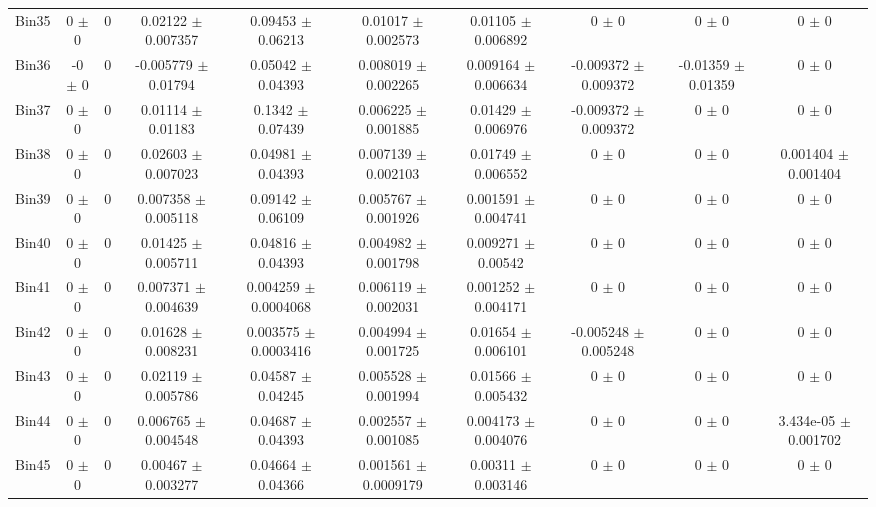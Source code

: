 \begin{tabular}{@{\extracolsep{4pt}}lccccccccc@{}}
     Bin35 & 0 $\pm$ 0 & 0 & 0.02122 $\pm$ 0.007357 & 0.09453 $\pm$ 0.06213 & 0.01017 $\pm$ 0.002573 & 0.01105 $\pm$ 0.006892 & 0 $\pm$ 0 & 0 $\pm$ 0 & 0 $\pm$ 0 \\ 
     Bin36 & -0 $\pm$ 0 & 0 & -0.005779 $\pm$ 0.01794 & 0.05042 $\pm$ 0.04393 & 0.008019 $\pm$ 0.002265 & 0.009164 $\pm$ 0.006634 & -0.009372 $\pm$ 0.009372 & -0.01359 $\pm$ 0.01359 & 0 $\pm$ 0 \\ 
     Bin37 & 0 $\pm$ 0 & 0 & 0.01114 $\pm$ 0.01183 & 0.1342 $\pm$ 0.07439 & 0.006225 $\pm$ 0.001885 & 0.01429 $\pm$ 0.006976 & -0.009372 $\pm$ 0.009372 & 0 $\pm$ 0 & 0 $\pm$ 0 \\ 
     Bin38 & 0 $\pm$ 0 & 0 & 0.02603 $\pm$ 0.007023 & 0.04981 $\pm$ 0.04393 & 0.007139 $\pm$ 0.002103 & 0.01749 $\pm$ 0.006552 & 0 $\pm$ 0 & 0 $\pm$ 0 & 0.001404 $\pm$ 0.001404 \\ 
     Bin39 & 0 $\pm$ 0 & 0 & 0.007358 $\pm$ 0.005118 & 0.09142 $\pm$ 0.06109 & 0.005767 $\pm$ 0.001926 & 0.001591 $\pm$ 0.004741 & 0 $\pm$ 0 & 0 $\pm$ 0 & 0 $\pm$ 0 \\ 
     Bin40 & 0 $\pm$ 0 & 0 & 0.01425 $\pm$ 0.005711 & 0.04816 $\pm$ 0.04393 & 0.004982 $\pm$ 0.001798 & 0.009271 $\pm$ 0.00542 & 0 $\pm$ 0 & 0 $\pm$ 0 & 0 $\pm$ 0 \\ 
     Bin41 & 0 $\pm$ 0 & 0 & 0.007371 $\pm$ 0.004639 & 0.004259 $\pm$ 0.0004068 & 0.006119 $\pm$ 0.002031 & 0.001252 $\pm$ 0.004171 & 0 $\pm$ 0 & 0 $\pm$ 0 & 0 $\pm$ 0 \\ 
     Bin42 & 0 $\pm$ 0 & 0 & 0.01628 $\pm$ 0.008231 & 0.003575 $\pm$ 0.0003416 & 0.004994 $\pm$ 0.001725 & 0.01654 $\pm$ 0.006101 & -0.005248 $\pm$ 0.005248 & 0 $\pm$ 0 & 0 $\pm$ 0 \\ 
     Bin43 & 0 $\pm$ 0 & 0 & 0.02119 $\pm$ 0.005786 & 0.04587 $\pm$ 0.04245 & 0.005528 $\pm$ 0.001994 & 0.01566 $\pm$ 0.005432 & 0 $\pm$ 0 & 0 $\pm$ 0 & 0 $\pm$ 0 \\ 
     Bin44 & 0 $\pm$ 0 & 0 & 0.006765 $\pm$ 0.004548 & 0.04687 $\pm$ 0.04393 & 0.002557 $\pm$ 0.001085 & 0.004173 $\pm$ 0.004076 & 0 $\pm$ 0 & 0 $\pm$ 0 & 3.434e-05 $\pm$ 0.001702 \\ 
     Bin45 & 0 $\pm$ 0 & 0 & 0.00467 $\pm$ 0.003277 & 0.04664 $\pm$ 0.04366 & 0.001561 $\pm$ 0.0009179 & 0.00311 $\pm$ 0.003146 & 0 $\pm$ 0 & 0 $\pm$ 0 & 0 $\pm$ 0 \\ 
\hline\hline
  \end{tabular}
